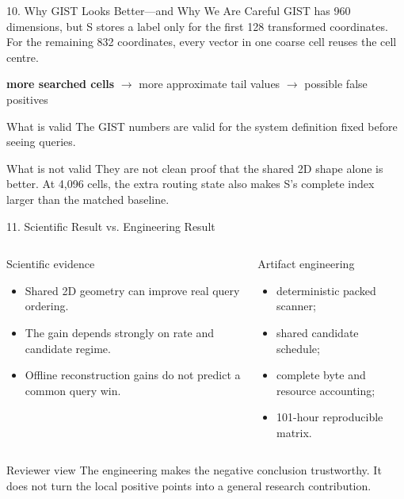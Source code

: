 \documentclass[aspectratio=169]{beamer}
\begin{document}
\begin{frame}{10. Why GIST Looks Better---and Why We Are Careful}
GIST has 960 dimensions, but S stores a label only for the first 128
transformed coordinates.
\medskip
For the remaining 832 coordinates, every vector in one coarse cell reuses the
cell centre.
\begin{center}
\textbf{more searched cells}
$\rightarrow$ more approximate tail values
$\rightarrow$ possible false positives
\end{center}
\begin{block}{What is valid}
The GIST numbers are valid for the system definition fixed before seeing
queries.
\end{block}
\begin{alertblock}{What is not valid}
They are not clean proof that the shared 2D shape alone is better. At 4,096
cells, the extra routing state also makes S's complete index larger than the
matched baseline.
\end{alertblock}
\end{frame}

\begin{frame}{11. Scientific Result vs. Engineering Result}
\begin{columns}[T]
\begin{block}{Scientific evidence}
\begin{itemize}
  \item Shared 2D geometry can improve real query ordering.
  \item The gain depends strongly on rate and candidate regime.
  \item Offline reconstruction gains do not predict a common query win.
\end{itemize}
\end{block}
\begin{block}{Artifact engineering}
\begin{itemize}
  \item deterministic packed scanner;
  \item shared candidate schedule;
  \item complete byte and resource accounting;
  \item 101-hour reproducible matrix.
\end{itemize}
\end{block}
\end{columns}
\begin{alertblock}{Reviewer view}
The engineering makes the negative conclusion trustworthy. It does not turn
the local positive points into a general research contribution.
\end{alertblock}
\end{frame}
\end{document}

